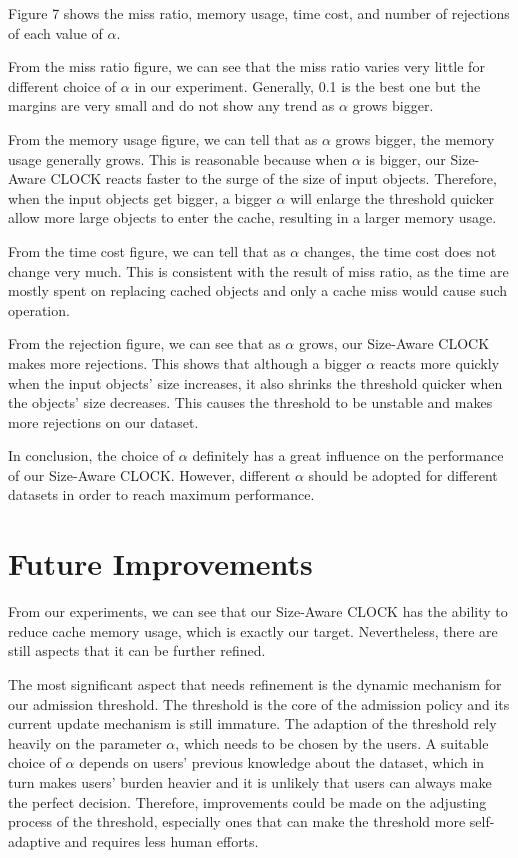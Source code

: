 \documentclass[conference]{IEEEtran}
\begin{document}
Figure 7 shows the miss ratio, memory usage, time cost, and number of rejections of each value of $\alpha$.

From the miss ratio figure, we can see that the miss ratio varies very little for different choice of $\alpha$ in our experiment. Generally, 0.1 is the best one but the margins are very small and do not show any trend as $\alpha$ grows bigger.

From the memory usage figure, we can tell that as $\alpha$ grows bigger, the memory usage generally grows. This is reasonable because when $\alpha$ is bigger, our Size-Aware CLOCK reacts faster to the surge of the size of input objects. Therefore, when the input objects get bigger, a bigger $\alpha$ will enlarge the threshold quicker allow more large objects to enter the cache, resulting in a larger memory usage.

From the time cost figure, we can tell that as $\alpha$ changes, the time cost does not change very much. This is consistent with the result of miss ratio, as the time are mostly spent on replacing cached objects and only a cache miss would cause such operation.

From the rejection figure, we can see that as $\alpha$ grows, our Size-Aware CLOCK makes more rejections. This shows that although a bigger $\alpha$ reacts more quickly when the input objects' size increases, it also shrinks the threshold quicker when the objects' size decreases. This causes the threshold to be unstable and makes more rejections on our dataset.

In conclusion, the choice of $\alpha$ definitely has a great influence on the performance of our Size-Aware CLOCK. However, different $\alpha$ should be adopted for different datasets in order to reach maximum performance.


\section{Future Improvements}
From our experiments, we can see that our Size-Aware CLOCK has the ability to reduce cache memory usage, which is exactly our target. Nevertheless, there are still aspects that it can be further refined. 

The most significant aspect that needs refinement is the dynamic mechanism for our admission threshold. The threshold is the core of the admission policy and its current update mechanism is still immature. The adaption of the threshold rely heavily on the parameter $\alpha$, which needs to be chosen by the users. A suitable choice of $\alpha$ depends on users' previous knowledge about the dataset, which in turn makes users' burden heavier and it is unlikely that users can always make the perfect decision. Therefore, improvements could be made on the adjusting process of the threshold, especially ones that can make the threshold more self-adaptive and requires less human efforts.
\end{document}
